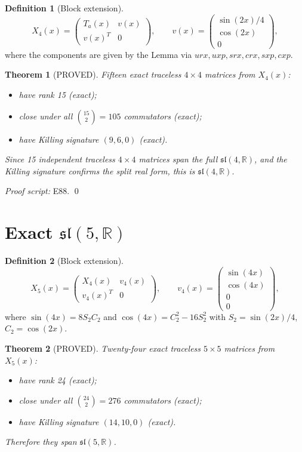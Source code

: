 \documentclass[11pt]{article}
\newtheorem{theorem}{Theorem}
\theoremstyle{definition}
\newtheorem{definition}{Definition}
\begin{document}
\begin{definition}[Block extension]
\[
X_4(x) =
\begin{pmatrix}
T_a(x) & v(x) \\
v(x)^T & 0
\end{pmatrix},
\qquad
v(x) =
\begin{pmatrix}
\sin(2x)/4 \\
\cos(2x) \\
0
\end{pmatrix},
\]
where the components are given by the Lemma via $urx,uxp,srx,crx,sxp,cxp$.
\end{definition}

\begin{theorem}[PROVED]
Fifteen exact traceless $4\times4$ matrices from $X_4(x)$:
\begin{itemize}
\item have rank 15 (exact);
\item close under all $\binom{15}{2}=105$ commutators (exact);
\item have Killing signature $(9,6,0)$ (exact).
\end{itemize}
Since 15 independent traceless $4\times4$ matrices span the full $\mathfrak{sl}(4,\mathbb{R})$, and the Killing signature confirms the split real form, this is $\mathfrak{sl}(4,\mathbb{R})$.
\end{theorem}

\noindent\textit{Proof script:} E88. \qed

\section{Exact $\mathfrak{sl}(5,\mathbb{R})$}

\begin{definition}[Block extension]
\[
X_5(x) =
\begin{pmatrix}
X_4(x) & v_4(x) \\
v_4(x)^T & 0
\end{pmatrix},
\qquad
v_4(x) =
\begin{pmatrix}
\sin(4x) \\
\cos(4x) \\
0 \\
0
\end{pmatrix},
\]
where $\sin(4x)=8S_2C_2$ and $\cos(4x)=C_2^2-16S_2^2$ with $S_2=\sin(2x)/4$, $C_2=\cos(2x)$.
\end{definition}

\begin{theorem}[PROVED]
Twenty-four exact traceless $5\times5$ matrices from $X_5(x)$:
\begin{itemize}
\item have rank 24 (exact);
\item close under all $\binom{24}{2}=276$ commutators (exact);
\item have Killing signature $(14,10,0)$ (exact).
\end{itemize}
Therefore they span $\mathfrak{sl}(5,\mathbb{R})$.
\end{theorem}
\end{document}
